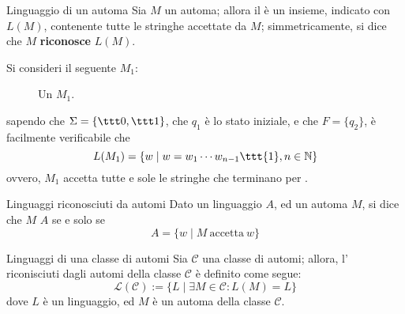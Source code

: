 \documentclass[a4paper, 12pt]{report}
\begin{document}
    \begin{frameddefn}[label={def L(M)}]{Linguaggio di un automa}
        Sia $M$ un automa; allora il  è un insieme, indicato con $L(M)$, contenente tutte le stringhe accettate da $M$; simmetricamente, si dice che $M$ \textbf{riconosce} $L(M)$.
    \end{frameddefn}

    \begin{example}
        Si consideri il seguente \DFA $M_1$:

        \begin{figure}[H]
            \centering
             \caption{Un \DFA $M_1$.}
        \end{figure}

        sapendo che $\Sigma = \{\ttt 0, \ttt 1\}$, che $q_1$ è lo stato iniziale, e che $F = \{q_2\}$, è facilmente verificabile che $$L(M_1) = \{w \mid w = w_1  \cdots w_{n - 1} \ttt{1}, n \in \mathbb{N}\}$$ ovvero, $M_1$ accetta tutte e sole le stringhe che terminano per .
    \end{example}

    \begin{frameddefn}{Linguaggi riconosciuti da automi}
        Dato un linguaggio $A$, ed un automa $M$, si dice che $M$  $A$ se e solo se $$A = \{w \mid M \ \mathrm{accetta} \ w\}$$
    \end{frameddefn}

    \begin{frameddefn}[label={ling automata}]{Linguaggi di una classe di automi}
        Sia $\mathcal{C}$ una classe di automi; allora, l' riconisciuti dagli automi della classe $\mathcal{C}$ è definito come segue: $$\mathcal L(\mathcal{C}) := \{L \mid \exists M \in \mathcal{C} : L(M) = L\}$$ dove $L$ è un linguaggio, ed $M$ è un automa della classe $\mathcal{C}$.
    \end{frameddefn}
\end{document}
